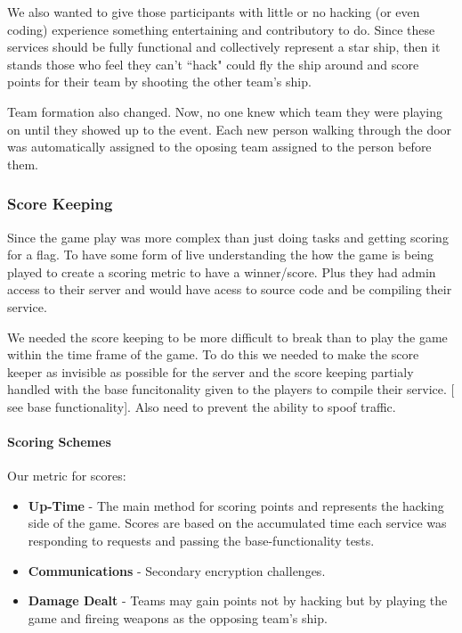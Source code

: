 \documentclass[10pt]{article}
\begin{document}
We also wanted to give those participants with little or no hacking (or even
coding) experience something entertaining and contributory to do. Since these
services should be fully functional and collectively represent a star ship, then
it stands those who feel they can't ``hack" could fly the ship around and
score points for their team by shooting the other team's ship.

Team formation also changed. Now, no one knew which team they were playing on
until they showed up to the event. Each new person walking through the door was
automatically assigned to the oposing team assigned to the person before them.

\subsubsection{Score Keeping}
\label{stscorekeeping}
Since the game play was more complex than just doing tasks and getting scoring
for a flag. To have some form of live understanding the how the game is being
played to create a scoring metric to have a winner/score. Plus they had
admin access to their server and would have acess to source code and be compiling
their service.

We needed the score keeping to be more difficult to break than to play the game 
within the time frame of the game. To do this we needed to make the score keeper
as invisible as possible for the server and the score keeping partialy handled with
the base funcitonality given to the players to compile their service. [ see base 
functionality]. Also need to prevent the ability to spoof traffic.

\paragraph*{Scoring Schemes} Our metric for scores:
\begin{itemize}
  \item \textbf{Up-Time} - The main method for scoring points and
  represents the hacking side of the game. Scores are based on the accumulated
  time each service was responding to requests and passing the base-functionality tests. 
  \item \textbf{Communications} - Secondary encryption challenges.
  \item \textbf{Damage Dealt} - Teams may gain points not by hacking but by
  playing the game and fireing weapons as the opposing team's ship.
\end{itemize}
\end{document}
